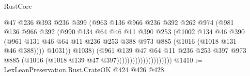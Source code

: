 \begin{lexlean}{RustCore}
\begin{coremodule}
                                        @47
                                        @236
                                        @393
                                        @236
                                        @399
                                        (@963
                                          @136
                                          @966
                                          @236
                                          @392
                                          @262
                                          @974
                                          (@981
                                            @136
                                            @966
                                            @392
                                            (@990
                                              @134
                                              @64
                                              @46
                                              @11
                                              @390
                                              @253
                                              (@1002
                                                @134
                                                @46
                                                @390
                                                (@961
                                                  @131
                                                  @46
                                                  @64
                                                  @11
                                                  @236
                                                  @253
                                                  @388
                                                  @973
                                                  @885
                                                  (@1016 (@1018 @131 @46 @388))))
                                              @1031))
                                          @1038)
                                        (@961
                                          @139
                                          @47
                                          @64
                                          @11
                                          @236
                                          @253
                                          @397
                                          @973
                                          @885
                                          (@1016 (@1018 @139 @47 @397)))))))))))))))))))))
@1410 := LexLeanPreservation.Rust.CrateOK @424 @426 @428

\end{coremodule}
\end{lexlean}
